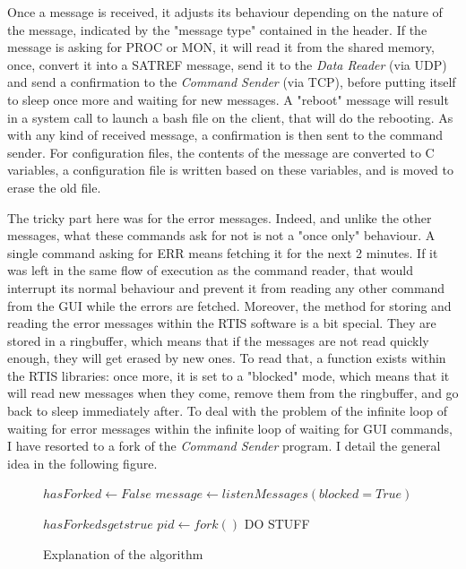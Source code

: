 \documentclass{themeensg}
\begin{document}
Once a message is received, it adjusts its behaviour depending on the nature of the message, indicated by the "message type" contained in the header. If the message is asking for PROC or MON, it will read it from the shared memory, once, convert it into a SATREF message, send it to the \textit{Data Reader} (via UDP) and send a confirmation to the \textit{Command Sender} (via TCP), before putting itself to sleep once more and waiting for new messages.
A "reboot" message will result in a system call to launch a bash file on the client, that will do the rebooting. As with any kind of received message, a confirmation is then sent to the command sender.
For configuration files, the contents of the message are converted to C variables, a configuration file is written based on these variables, and is moved to erase the old file.

The tricky part here was for the error messages. Indeed, and unlike the other messages, what these commands ask for not is not a "once only" behaviour. A single command asking for ERR means fetching it for the next 2 minutes. If it was left in the same flow of execution as the command reader, that would interrupt its normal behaviour and prevent it from reading any other command from the GUI while the errors are fetched.
Moreover, the method for storing and reading the error messages within the RTIS software is a bit special. They are stored in a ringbuffer, which means that if the messages are not read quickly enough, they will get erased by new ones. To read that, a function exists within the RTIS libraries: once more, it is set to a "blocked" mode, which means that it will read new messages when they come, remove them from the ringbuffer, and go back to sleep immediately after.
To deal with the problem of the infinite loop of waiting for error messages within the infinite loop of waiting for GUI commands, I have resorted to a fork of the \textit{Command Sender} program. I detail the general idea in the following figure.


\begin{figure}[!ht]
	\centering
	\begin{algorithmic}
		\State $hasForked \gets False$
			\State $message \gets listenMessages(blocked=True)$
			
					\State $hasForked sgets true$
					\State $pid \gets fork()$
				\EndIf
						\State DO STUFF
					\EndWhile
				\EndIf
			\EndIf
		\EndWhile	
				
				
	\end{algorithmic}
	\caption{Explanation of the algorithm}
\end{figure}
\end{document}
